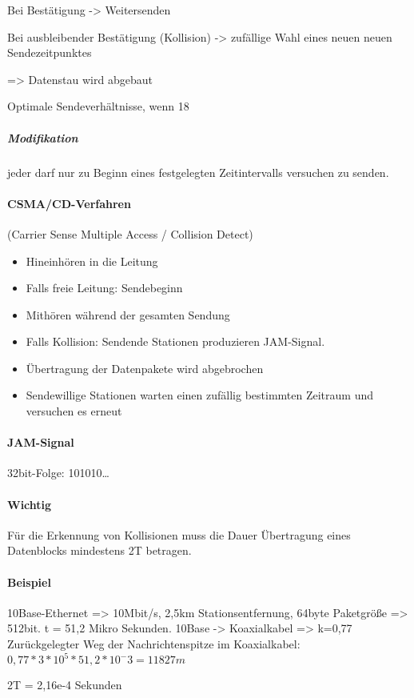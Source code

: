 Bei Bestätigung -> Weitersenden

Bei ausbleibender Bestätigung (Kollision) ->  zufällige Wahl eines neuen neuen Sendezeitpunktes

=> Datenstau wird abgebaut

Optimale Sendeverhältnisse, wenn 18%

\subparagraph{Modifikation} jeder darf nur zu Beginn eines festgelegten Zeitintervalls versuchen zu senden.

\paragraph{CSMA/CD-Verfahren}
(Carrier Sense Multiple Access / Collision Detect)

\begin{itemize}
\item Hineinhören in die Leitung
\item Falls freie Leitung: Sendebeginn
\item Mithören während der gesamten Sendung
\item Falls Kollision: Sendende Stationen produzieren JAM-Signal.
\item Übertragung der Datenpakete wird abgebrochen
\item Sendewillige Stationen warten einen zufällig bestimmten Zeitraum und versuchen es erneut
\end{itemize}

\paragraph{JAM-Signal} 32bit-Folge: 101010… 

\paragraph{Wichtig} Für die Erkennung von Kollisionen muss die Dauer Übertragung eines Datenblocks mindestens 2T betragen. 

\paragraph{Beispiel} 10Base-Ethernet => 10Mbit/s, 2,5km Stationsentfernung, 64byte Paketgröße => 512bit. t = 51,2 Mikro Sekunden.
10Base -> Koaxialkabel => k=0,77
Zurückgelegter Weg der Nachrichtenspitze im Koaxialkabel: $0,77 * 3*10^5 * 51,2*10^-3 = 11827m$

2T = 2,16e-4 Sekunden

